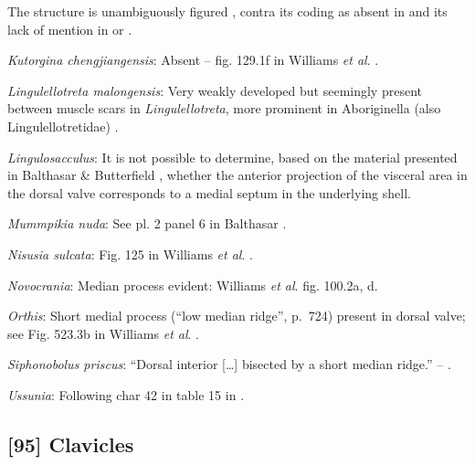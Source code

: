 \documentclass[openany]{book}
\theoremstyle{definition}
\theoremstyle{definition}
\theoremstyle{definition}
\theoremstyle{remark}
\begin{document}
The structure is unambiguously figured \citep[e.g.~fig. 5.1
in][]{Chen2007Reinterpretationof}, contra its coding as absent in
\citet{Williams2000LinguliformeaCraniiformea} and its lack of mention in
\citet{Williams2007Supplement} or \citet{Zhang2009Architectureand}.

\hypertarget{Kutorgina_chengjiangensis-coding-94}{}
\emph{Kutorgina chengjiangensis}: Absent -- fig. 129.1f in Williams
\emph{et al}. \citeyearpar{Williams2000LinguliformeaCraniiformea}.

\hypertarget{Lingulellotreta_malongensis-coding-94}{}
\emph{Lingulellotreta malongensis}: Very weakly developed but seemingly
present between muscle scars in \emph{Lingulellotreta}, more prominent
in Aboriginella (also Lingulellotretidae) \citep[fig.
34]{Williams2000LinguliformeaCraniiformea}.

\hypertarget{Lingulosacculus-coding-94}{}
\emph{Lingulosacculus}: It is not possible to determine, based on the
material presented in Balthasar \& Butterfield
\citeyearpar{Balthasar2009EarlyCambrian}, whether the anterior
projection of the visceral area in the dorsal valve corresponds to a
medial septum in the underlying shell.

\hypertarget{Mummpikia_nuda-coding-94}{}
\emph{Mummpikia nuda}: See pl. 2 panel 6 in Balthasar
\citeyearpar{Balthasar2008iMummpikia}.

\hypertarget{Nisusia_sulcata-coding-94}{}
\emph{Nisusia sulcata}: Fig. 125 in Williams \emph{et al}.
\citeyearpar{Williams2000LinguliformeaCraniiformea}.

\hypertarget{Novocrania-coding-94}{}
\emph{Novocrania}: Median process evident: Williams \emph{et al}.
\citeyearpar{Williams2000LinguliformeaCraniiformea} fig. 100.2a, d.

\hypertarget{Orthis-coding-94}{}
\emph{Orthis}: Short medial process (``low median ridge'', p.~724)
present in dorsal valve; see Fig. 523.3b in Williams \emph{et al}.
\citeyearpar{Williams2000LinguliformeaCraniiformea}.

\hypertarget{Siphonobolus_priscus-coding-94}{}
\emph{Siphonobolus priscus}: ``Dorsal interior {[}\ldots{}{]} bisected
by a short median ridge.'' -- \citet{Popov2009Earlyontogeny}.

\hypertarget{Ussunia-coding-94}{}
\emph{Ussunia}: Following char 42 in table 15 in
\citet{Williams2000LinguliformeaCraniiformea}.

\subsection*{{[}95{]} Clavicles}\label{clavicles}
\end{document}
